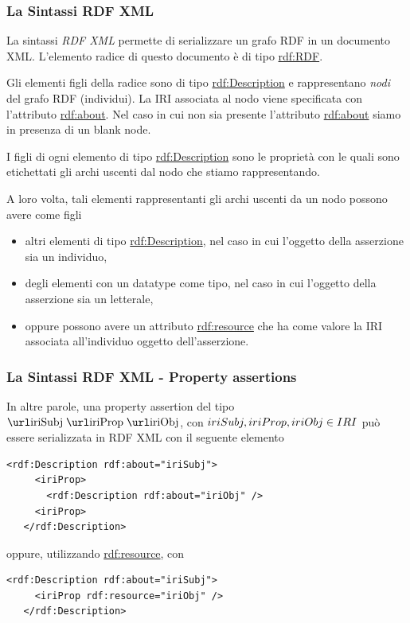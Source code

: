 \documentclass[8pt]{beamer}
\begin{document}
\begin{frame}
 \frametitle{La Sintassi RDF XML}
 La sintassi \emph{RDF XML} permette di serializzare un grafo RDF 
 in un documento XML. L'elemento radice di questo documento \`e di
 tipo \url{rdf:RDF}.
 \vspace{\baselineskip}
 
 Gli elementi figli della radice sono di tipo \url{rdf:Description}
 e rappresentano \emph{nodi} del grafo RDF (individui). La IRI associata 
 al nodo viene specificata con l'attributo \url{rdf:about}. Nel caso in
 cui non sia presente l'attributo \url{rdf:about} siamo in presenza
 di un blank node.
 \vspace{\baselineskip}

 I figli di ogni elemento di tipo \url{rdf:Description} sono le
 propriet\`a con le quali sono etichettati gli archi uscenti dal 
 nodo che stiamo rappresentando.
 \vspace{\baselineskip}

 A loro volta, tali elementi rappresentanti gli archi uscenti da
 un nodo possono avere come figli 
 \begin{itemize}
  \item altri elementi di tipo \url{rdf:Description}, nel caso in cui
  l'oggetto della asserzione sia un individuo,
  \item degli elementi con un datatype come tipo, nel caso in cui 
  l'oggetto della asserzione sia un letterale,
  \item oppure possono avere un attributo \url{rdf:resource} che ha
  come valore la IRI associata all'individuo oggetto dell'asserzione.
 \end{itemize}
\end{frame}

\begin{frame}[fragile]
 \frametitle{La Sintassi RDF XML - Property assertions}
 In altre parole, una property assertion del tipo $\tripleO{iriSubj}{iriProp}{iriObj}$,
 con $iriSubj, iriProp, iriObj \in IRI$ pu\`o essere serializzata in RDF XML 
 con il seguente elemento 

 \begin{Verbatim}[fontsize=\small]
   <rdf:Description rdf:about="iriSubj">
     <iriProp>
       <rdf:Description rdf:about="iriObj" />
     <iriProp>      
   </rdf:Description>
\end{Verbatim}

oppure, utilizzando \url{rdf:resource}, con

\begin{Verbatim}[fontsize=\small]
   <rdf:Description rdf:about="iriSubj">
     <iriProp rdf:resource="iriObj" />
   </rdf:Description>
\end{Verbatim}
\end{frame}
\end{document}
